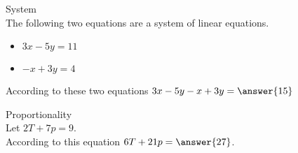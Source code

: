 \documentclass{ximera}
\begin{document}
\begin{exercise} System \\


The following two equations are a system of linear equations.

\begin{itemize}
  \item $3x - 5y = 11$
  \item $-x + 3y = 4$
\end{itemize}


According to these two equations $3x - 5y - x + 3y = \answer{15}$


\end{exercise}














\begin{exercise} Proportionality \\


Let $2T + 7p = 9$. \\


According to this equation $6T + 21p = \answer{27}$.


\end{exercise}
\end{document}

